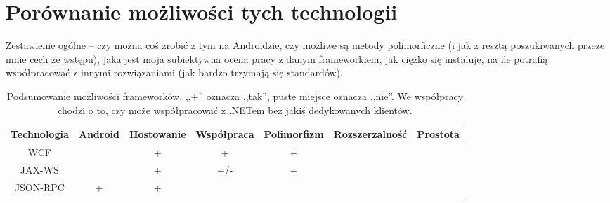 \section{Porównanie możliwości tych technologii}
Zestawienie ogólne -- czy można coś zrobić z tym na Androidzie, czy możliwe są metody polimorficzne (i jak z resztą poszukiwanych przeze mnie cech ze wstępu), jaka jest moja subiektywna ocena pracy z danym frameworkiem, jak ciężko się instaluje, na ile potrafią współpracować z innymi rozwiązaniami (jak bardzo trzymają się standardów).


\begin{table}[htbp]
	\centering
		\begin{tabular}{ | c || c | c | c | c | c | c |}
			\hline
				Technologia & Android & Hostowanie & Współpraca & Polimorfizm & Rozszerzalność & Prostota  \\
				\hline \hline
				WCF & & + & + & + & &\\
				\hline
				JAX-WS & & + & +/- & + & &\\
				\hline
				JSON-RPC & + & + & & & &\\
				\hline
		\end{tabular}
	\caption[Podsumowanie możliwości frameworków.]{Podsumowanie możliwości frameworków. ,,+'' oznacza ,,tak'', puste miejsce oznacza ,,nie''. We współpracy chodzi o to, czy może współpracować z .NETem bez jakiś dedykowanych klientów.}
	\label{tab:frameworks-summary}
\end{table}


